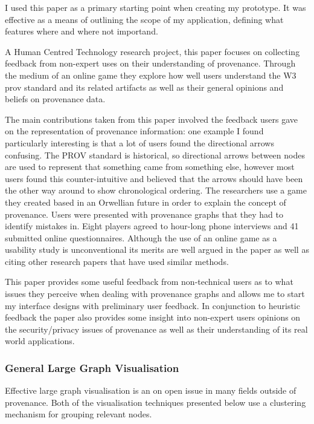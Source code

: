 I used this paper as a primary starting point when creating my prototype. It was effective as a means of outlining the scope of my application, defining what features where and where not importand.

A Human Centred Technology research project, this paper focuses on collecting feedback from non-expert uses on their understanding of provenance. Through the medium of an online game they explore how well users understand the W3 prov standard\cite{primer2013} and its related artifacts as well as their general opinions and beliefs on provenance data.

The main contributions taken from this paper involved the feedback users gave on the representation of provenance information: one example I found particularly interesting is that a lot of users found the directional arrows confusing. The PROV standard is historical, so directional arrows between nodes are used to represent that something came from something else, however most users found this counter-intuitive and believed that the arrows should have been the other way around to show chronological ordering. The researchers use a game they created based in an Orwellian future in order to explain the concept of provenance. Users were presented with provenance graphs that they had to identify mistakes in. Eight players agreed to hour-long phone interviews and 41 submitted online questionnaires. Although the use of an online game as a usability study is unconventional its merits are well argued in the paper as well as citing other research papers that have used similar methods.

This paper provides some useful feedback from non-technical users as to what issues they perceive when dealing with provenance graphs and allows me to start my interface designs with preliminary user feedback. In conjunction to heuristic feedback the paper also provides some insight into non-expert users opinions on the security/privacy issues of provenance as well as their understanding of its real world applications.

\subsubsection{General Large Graph Visualisation}
\label{sub:large_graph_visualisation}

Effective large graph visualisation is an on open issue in many fields outside of provenance. Both of the visualisation techniques presented below use a clustering mechanism for grouping relevant nodes. 

